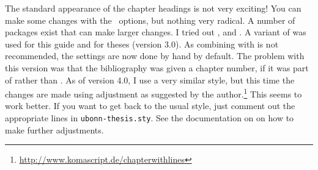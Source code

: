 The standard appearance of the chapter headings is not very exciting!
You can make some changes with the \KOMAScript\ options, but nothing
very radical. A number of packages exist that can make larger
changes. I tried out ,  and
. A variant of  was used for this
guide and for theses (version 3.0).
As combining  with \KOMAScript{} is not recommended,
the settings are now done by hand by default.
The problem with this version was that the bibliography was given a chapter number,
if it was part of  rather than .
As of version 4.0, I use a very similar style,
but this time the changes are made using \KOMAScript{} adjustment as suggested by the author.\footnote{%
\url{http://www.komascript.de/chapterwithlines}}
This seems to work better.
If you want to get back to the
usual style, just comment out the appropriate lines in
\texttt{ubonn-thesis.sty}. See the documentation on
 on how to make further adjustments.

